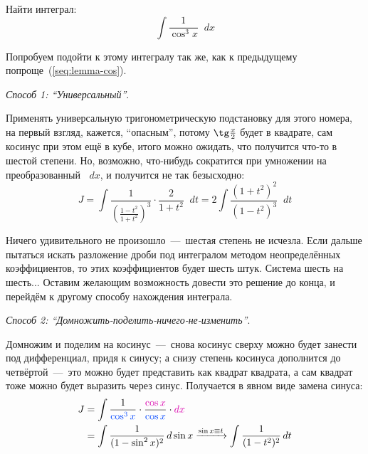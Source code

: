 \documentclass[a4paper,12pt]{article}
\newcommand{\diff}{\mathop{}\!d}
\begin{document}
  Найти интеграл:
  \begin{equation}
    \int \frac{1}{\cos^3 x} \diff x
  \end{equation}
  
  \begin{solution}
    Попробуем подойти к этому интегралу так же, как к предыдущему попроще~(\ref{seq:lemma-cos}).

    \medskip

    \noindent
    \emph{Способ 1: ``Универсальный''}.

    Применять универсальную тригонометрическую подстановку для этого номера, на первый взгляд, кажется, ``опасным'', потому $\tg \frac{x}{2}$ будет в квадрате, сам косинус при этом ещё в кубе, итого можно ожидать, что получится что-то в шестой степени.
    Но, возможно, что-нибудь сократится при умножении на преобразованный $\diff x$, и получится не так безысходно:
    \[
      J = \int \frac{1}{\left(\frac{1 - t^2}{1 + t^2}\right)^{\!3}} \cdot \frac{2}{1 + t^2} \diff t = 2\int \frac{(1 + t^2)^2}{(1 - t^2)^3} \diff t
    \]

    Ничего удивительного не произошло~---~шестая степень не исчезла.
    Если дальше пытаться искать разложение дроби под интегралом методом неопределённых коэффициентов, то этих коэффициентов будет шесть штук.
    Система шесть на шесть...
    Оставим желающим возможность довести это решение до конца, и перейдём к другому способу нахождения интеграла.

    \medskip

    \noindent
    \emph{Способ 2: ``Домножить-поделить-ничего-не-изменить''}.

    Домножим и поделим на косинус~---~снова косинус сверху можно будет занести под дифференциал, придя к синусу; а снизу степень косинуса дополнится до четвёртой~---~это можно будет представить как квадрат квадрата, а сам квадрат тоже можно будет выразить через синус.
    Получается в явном виде замена синуса:
    \begin{equation*}
    \begin{split}
      J &= \int \frac{1}{\textcolor{blue}{\cos^3 x}} \cdot \frac{\textcolor{pink}{\cos x}}{\textcolor{blue}{\cos x}} \cdot \textcolor{pink}{\diff x}\\
        &= \int \frac{1}{(1 - \sin^2 x)^2} \diff \sin x \xrightarrow{\sin x \equiv t} \int \frac{1}{(1 - t^2)^2} \diff t
    \end{split}
    \end{equation*}


\end{solution}
\end{document}
